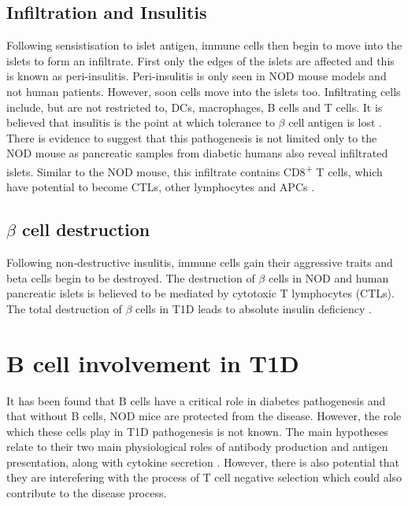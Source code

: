 \subsection{Infiltration and Insulitis}

Following sensistisation to islet antigen, immune cells then begin to move into the islets to form an infiltrate.
First only the edges of the islets are affected and this is known as peri-insulitis\citep{Thomas2000}.
Peri-insulitis is only seen in NOD mouse models and not human patients.
However, soon cells move into the islets too.
Infiltrating cells include, but are not restricted to, DCs, macrophages, B cells and T cells\citep{Brodie2008}.
It is believed that insulitis is the point at which tolerance to $\beta$ cell antigen is lost \citep{Thomas2000}.
There is evidence to suggest that this pathogenesis is not limited only to the NOD mouse as pancreatic samples from diabetic humans also reveal infiltrated islets.
Similar to the NOD mouse, this infiltrate contains CD8\textsuperscript{+} T cells, which have potential to become CTLs, other lymphocytes and APCs \citep{Hanafusa2008}.

\subsection{$\beta$ cell destruction}

Following non-destructive insulitis, immune cells gain their aggressive traits and beta cells begin to be destroyed.
The destruction of $\beta$ cells in NOD and human pancreatic islets is believed to be mediated by cytotoxic T lymphocytes (CTLs)\citep{Thomas2000, Brodie2008, Hanafusa2008}.
The total destruction of $\beta$ cells in T1D leads to absolute insulin deficiency \citep{Daneman2006}.


\section{B cell involvement in T1D}
\label{sec:BcellsinT1D}

It has been found that B cells have a critical role in diabetes pathogenesis and that without B cells, NOD mice are protected from the disease.
However, the role which these cells play in T1D pathogenesis is not known.
The main hypotheses relate to their two main physiological roles of antibody production and antigen presentation, along with cytokine secretion \citep{Hinman2014}.
However, there is also potential that they are interefering with the process of T cell negative selection which could also contribute to the disease process.

